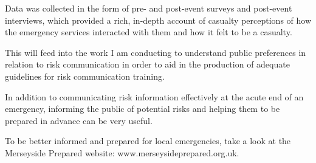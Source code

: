\documentclass[11pt]{article}%
\begin{document}
\begin{minipage}{.75\linewidth}
\begin{multicols}{2}
Data was collected in the form of pre- and post-event surveys and post-event interviews, which provided a rich, in-depth account of casualty perceptions of how the emergency services interacted with them and how it felt to be a casualty.

This will feed into the work I am conducting to understand public preferences in relation to risk communication in order to aid in the production of adequate guidelines for risk communication training.

In addition to communicating risk information effectively at the acute end of an emergency, informing the public of potential risks and helping them to be prepared in advance can be very useful.

To be better informed and prepared for local emergencies, take a look at the Merseyside Prepared website: www.merseysideprepared.org.uk. 



\end{multicols}
\end{minipage}
\hspace{0.01\textwidth}
\end{document}
